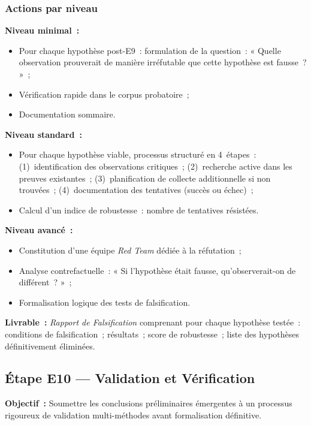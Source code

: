 \subsubsection*{Actions par niveau}

\textbf{Niveau minimal~:}
\begin{itemize}
    \item Pour chaque hypothèse post-E9~: formulation de la question~: « Quelle
          observation prouverait de manière irréfutable que cette hypothèse est
          fausse~? »~;
    \item Vérification rapide dans le corpus probatoire~;
    \item Documentation sommaire.
\end{itemize}

\textbf{Niveau standard~:}
\begin{itemize}
    \item Pour chaque hypothèse viable, processus structuré en 4~étapes~:
          (1)~identification des observations critiques~;
          (2)~recherche active dans les preuves existantes~;
          (3)~planification de collecte additionnelle si non trouvées~;
          (4)~documentation des tentatives (succès ou échec)~;
    \item Calcul d'un indice de robustesse~: nombre de tentatives résistées.
\end{itemize}

\textbf{Niveau avancé~:}
\begin{itemize}
    \item Constitution d'une équipe \textit{Red Team} dédiée à la réfutation~;
    \item Analyse contrefactuelle~: « Si l'hypothèse était fausse,
          qu'observerait-on de différent~? »~;
    \item Formalisation logique des tests de falsification.
\end{itemize}

\textbf{Livrable~:} \textit{Rapport de Falsification} comprenant pour chaque
hypothèse testée~: conditions de falsification~; résultats~; score de robustesse~;
liste des hypothèses définitivement éliminées.

\subsection{Étape E10 --- Validation et Vérification}

\textbf{Objectif~:} Soumettre les conclusions préliminaires émergentes à un
processus rigoureux de validation multi-méthodes avant formalisation définitive.

